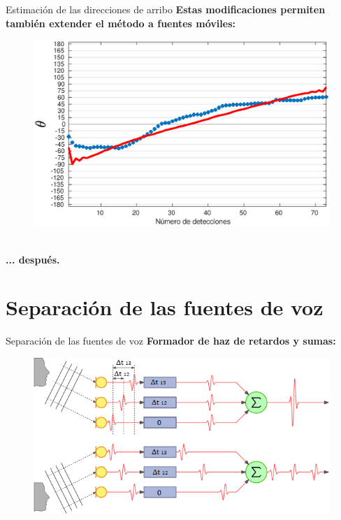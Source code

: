\documentclass[12pt,aspectratio=169]{beamer}
\begin{document}
	\begin{frame}{Estimación de las direcciones de arribo}
		\textbf{Estas modificaciones permiten también extender el método a fuentes móviles:}
		
		\hspace{20mm}
		\begin{minipage} {105mm}
			\begin{figure}[h]
				\centering
				\includegraphics[width=0.98\linewidth]{figures/moving130kmean10degrees}
			\end{figure}
		\end{minipage}\\
		\hspace{130mm}\textbf{... después.}
	\end{frame}
	
	\section{Separación de las fuentes de voz}
	
	\begin{frame}{Separación de las fuentes de voz}
		\textbf{Formador de haz de retardos y sumas:}\\	
		\vspace{5mm}
		\begin{figure}[h]
			\centering
			\includegraphics[width=0.7\linewidth]{figures/steer}
		\end{figure}
	\end{frame}
	
\end{document}
